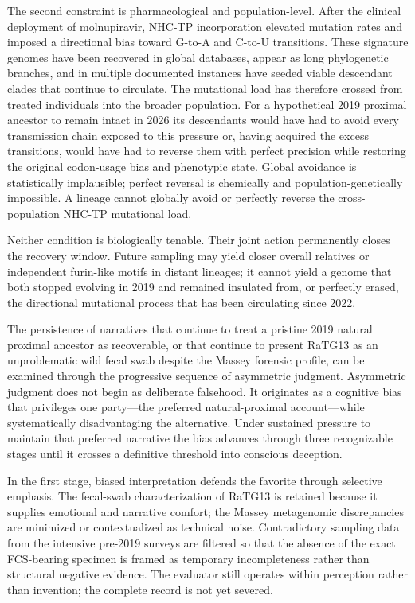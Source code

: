The second constraint is pharmacological and population-level. After the clinical deployment of molnupiravir, NHC-TP incorporation elevated mutation rates and imposed a directional bias toward G-to-A and C-to-U transitions. These signature genomes have been recovered in global databases, appear as long phylogenetic branches, and in multiple documented instances have seeded viable descendant clades that continue to circulate. The mutational load has therefore crossed from treated individuals into the broader population. For a hypothetical 2019 proximal ancestor to remain intact in 2026 its descendants would have had to avoid every transmission chain exposed to this pressure or, having acquired the excess transitions, would have had to reverse them with perfect precision while restoring the original codon-usage bias and phenotypic state. Global avoidance is statistically implausible; perfect reversal is chemically and population-genetically impossible. A lineage cannot globally avoid or perfectly reverse the cross-population NHC-TP mutational load.

Neither condition is biologically tenable. Their joint action permanently closes the recovery window. Future sampling may yield closer overall relatives or independent furin-like motifs in distant lineages; it cannot yield a genome that both stopped evolving in 2019 and remained insulated from, or perfectly erased, the directional mutational process that has been circulating since 2022.

The persistence of narratives that continue to treat a pristine 2019 natural proximal ancestor as recoverable, or that continue to present RaTG13 as an unproblematic wild fecal swab despite the Massey forensic profile, can be examined through the progressive sequence of asymmetric judgment. Asymmetric judgment does not begin as deliberate falsehood. It originates as a cognitive bias that privileges one party—the preferred natural-proximal account—while systematically disadvantaging the alternative. Under sustained pressure to maintain that preferred narrative the bias advances through three recognizable stages until it crosses a definitive threshold into conscious deception.

In the first stage, biased interpretation defends the favorite through selective emphasis. The fecal-swab characterization of RaTG13 is retained because it supplies emotional and narrative comfort; the Massey metagenomic discrepancies are minimized or contextualized as technical noise. Contradictory sampling data from the intensive pre-2019 surveys are filtered so that the absence of the exact FCS-bearing specimen is framed as temporary incompleteness rather than structural negative evidence. The evaluator still operates within perception rather than invention; the complete record is not yet severed.

